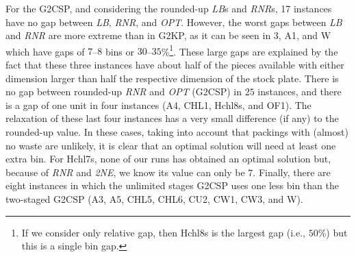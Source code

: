 \documentclass[9pt]{entcs}
\begin{document}
For the G2CSP, and considering the rounded-up \emph{LB}s and \emph{RNR}s, 17 instances have no gap between \emph{LB}, \emph{RNR}, and \emph{OPT}.
However, the worst gaps between \emph{LB} and \emph{RNR} are more extreme than in G2KP, as it can be seen in 3, A1, and W which have gaps of \(7\)--\(8\) bins or \(30\)--\(35\)\%\footnote{If we consider only relative gap, then Hchl8s is the largest gap (i.e., \(50\)\%) but this is a single bin gap.}.
These large gaps are explained by the fact that these three instances have about half of the pieces available with either dimension larger than half the respective dimension of the stock plate.
There is no gap between rounded-up \emph{RNR} and \emph{OPT} (G2CSP) in \(25\) instances, and there is a gap of one unit in four instances (A4, CHL1, Hchl8s, and OF1).
The relaxation of these last four instances has a very small difference (if any) to the rounded-up value.
In these cases, taking into account that packings with (almost) no waste are unlikely, it is clear that an optimal solution will need at least one extra bin.
For Hchl7s, none of our runs has obtained an optimal solution but, because of \emph{RNR} and \emph{2NE}, we know its value can only be \(7\).
Finally, there are eight instances in which the unlimited stages G2CSP uses one less bin than the two-staged G2CSP (A3, A5, CHL5, CHL6, CU2, CW1, CW3, and W).
\end{document}

